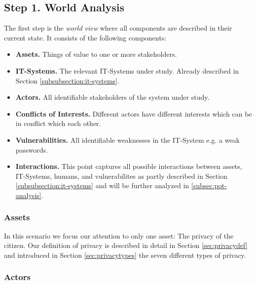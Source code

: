 \documentclass[runningheads,a4paper]{llncs}
\begin{document}
\subsection{Step 1. World Analysis}

\label{subsec:world-analysis}

The first step is the \emph{world view} where all components are described in their current state. It consists of the following components:
\begin{itemize}
	
	\item \textbf{Assets.} 
	Things of value to one or more stakeholders.
	
	\item \textbf{IT-Systems.}
	The relevant IT-Systems under study. Already described in Section \ref{subsubsection:it-systems}.
		
	\item \textbf{Actors.}
	All identifiable stakeholders of the system under study.
	
	\item \textbf{Conflicts of Interests.}
	Different actors have different interests which can be in conflict which each other.
	
	\item \textbf{Vulnerabilities.}
	All identifiable weaknesses in the IT-System e.g. a weak passwords.
	
	\item \textbf{Interactions.}
	This point captures all possible interactions between assets, IT-Systems, humans, and vulnerabilites as partly described in Section \ref{subsubsection:it-systems} and will be further analyzed in \ref{subsec:pot-analysis}.
	
\end{itemize}


\subsubsection{Assets}

In this scenario we focus our attention to only one asset: The privacy of the citizen.
Our definition of privacy is described in detail in Section \ref{sec:privacydef} and introduced in Section \ref{sec:privacytypes} the seven different types of privacy.


\subsubsection{Actors}
\label{subsubsection:humans}
\end{document}
